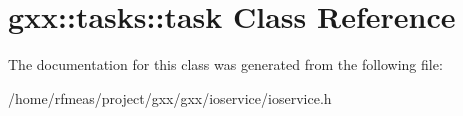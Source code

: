 \hypertarget{classgxx_1_1tasks_1_1task}{}\section{gxx\+:\+:tasks\+:\+:task Class Reference}
\label{classgxx_1_1tasks_1_1task}


The documentation for this class was generated from the following file\+:\begin{DoxyCompactItemize}
\item 
/home/rfmeas/project/gxx/gxx/ioservice/ioservice.\+h\end{DoxyCompactItemize}
